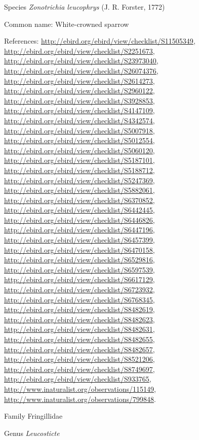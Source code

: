 \documentclass[9pt, article]{memoir}
\begin{document}
\begin{multicols}{2}
\vspace{6pt}\noindent\hspace{36pt}Species \textit{Zonotrichia leucophrys} (J. R. Forster, 1772)


Common name: White-crowned sparrow

References: 
\url{http://ebird.org/ebird/view/checklist/S11505349}, 
\url{http://ebird.org/ebird/view/checklist/S2251673}, 
\url{http://ebird.org/ebird/view/checklist/S23973040}, 
\url{http://ebird.org/ebird/view/checklist/S26074376}, 
\url{http://ebird.org/ebird/view/checklist/S2614273}, 
\url{http://ebird.org/ebird/view/checklist/S2960122}, 
\url{http://ebird.org/ebird/view/checklist/S3928853}, 
\url{http://ebird.org/ebird/view/checklist/S4147109}, 
\url{http://ebird.org/ebird/view/checklist/S4342574}, 
\url{http://ebird.org/ebird/view/checklist/S5007918}, 
\url{http://ebird.org/ebird/view/checklist/S5012554}, 
\url{http://ebird.org/ebird/view/checklist/S5060120}, 
\url{http://ebird.org/ebird/view/checklist/S5187101}, 
\url{http://ebird.org/ebird/view/checklist/S5188712}, 
\url{http://ebird.org/ebird/view/checklist/S5247369}, 
\url{http://ebird.org/ebird/view/checklist/S5882061}, 
\url{http://ebird.org/ebird/view/checklist/S6370852}, 
\url{http://ebird.org/ebird/view/checklist/S6442445}, 
\url{http://ebird.org/ebird/view/checklist/S6446826}, 
\url{http://ebird.org/ebird/view/checklist/S6447196}, 
\url{http://ebird.org/ebird/view/checklist/S6457399}, 
\url{http://ebird.org/ebird/view/checklist/S6470158}, 
\url{http://ebird.org/ebird/view/checklist/S6529816}, 
\url{http://ebird.org/ebird/view/checklist/S6597539}, 
\url{http://ebird.org/ebird/view/checklist/S6617129}, 
\url{http://ebird.org/ebird/view/checklist/S6723932}, 
\url{http://ebird.org/ebird/view/checklist/S6768345}, 
\url{http://ebird.org/ebird/view/checklist/S8482619}, 
\url{http://ebird.org/ebird/view/checklist/S8482623}, 
\url{http://ebird.org/ebird/view/checklist/S8482631}, 
\url{http://ebird.org/ebird/view/checklist/S8482655}, 
\url{http://ebird.org/ebird/view/checklist/S8482657}, 
\url{http://ebird.org/ebird/view/checklist/S8521206}, 
\url{http://ebird.org/ebird/view/checklist/S8749697}, 
\url{http://ebird.org/ebird/view/checklist/S933765}, 
\url{http://www.inaturalist.org/observations/115149}, 
\url{http://www.inaturalist.org/observations/799848}.

\vspace{6pt}\noindent\hspace{24pt}Family Fringillidae


\vspace{6pt}\noindent\hspace{30pt}Genus \textit{Leucosticte}



\end{multicols}
\end{document}
